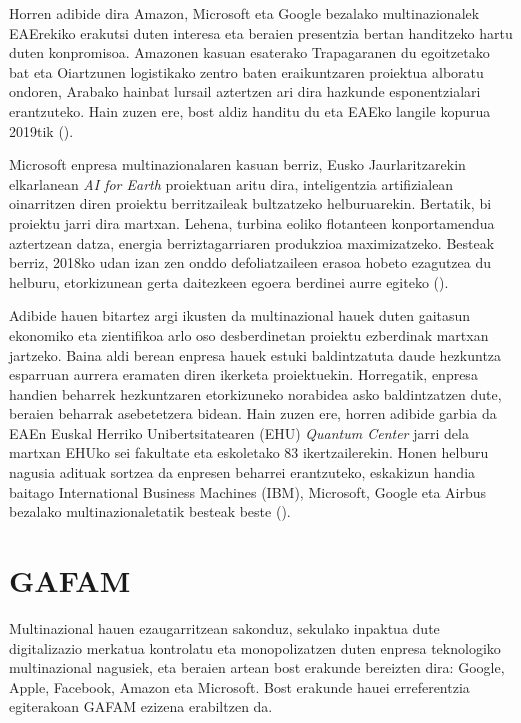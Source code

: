 Horren adibide dira Amazon, Microsoft eta Google bezalako multinazionalek EAErekiko erakutsi duten interesa eta beraien presentzia bertan handitzeko hartu duten konpromisoa. Amazonen kasuan esaterako Trapagaranen du egoitzetako bat eta Oiartzunen logistikako zentro baten eraikuntzaren proiektua alboratu ondoren, Arabako hainbat lursail aztertzen ari dira hazkunde esponentzialari erantzuteko. Hain zuzen ere, bost aldiz handitu du eta EAEko langile kopurua 2019tik (\cite{irigoyen2021amazon}).

Microsoft enpresa multinazionalaren kasuan berriz, Eusko Jaurlaritzarekin elkarlanean \textit{AI for Earth} proiektuan aritu dira, inteligentzia artifizialean oinarritzen diren proiektu berritzaileak bultzatzeko helburuarekin. Bertatik, bi proiektu jarri dira martxan. Lehena, turbina eoliko flotanteen konportamendua aztertzean datza, energia berriztagarriaren produkzioa maximizatzeko. Besteak berriz, 2018ko udan izan zen onddo defoliatzaileen erasoa hobeto ezagutzea du helburu, etorkizunean gerta daitezkeen egoera berdinei aurre egiteko (\cite{microsoft2020microsoft}).

Adibide hauen bitartez argi ikusten da multinazional hauek duten gaitasun ekonomiko eta zientifikoa arlo oso desberdinetan proiektu ezberdinak martxan jartzeko. Baina aldi berean enpresa hauek estuki baldintzatuta daude hezkuntza esparruan aurrera eramaten diren ikerketa proiektuekin. Horregatik, enpresa handien beharrek hezkuntzaren etorkizuneko norabidea asko baldintzatzen dute, beraien beharrak asebetetzera bidean. Hain zuzen ere, horren adibide garbia da EAEn Euskal Herriko Unibertsitatearen (EHU) \textit{Quantum Center} jarri dela martxan EHUko sei fakultate eta eskoletako 83 ikertzailerekin. Honen helburu nagusia adituak sortzea da enpresen beharrei erantzuteko, eskakizun handia baitago International Business Machines (IBM), Microsoft, Google eta Airbus bezalako multinazionaletatik besteak beste (\cite{gamez2020euskadi}).

\section{GAFAM}\label{sec:gafam}

Multinazional hauen ezaugarritzean sakonduz, sekulako inpaktua dute digitalizazio merkatua kontrolatu eta monopolizatzen duten enpresa teknologiko multinazional nagusiek, eta beraien artean bost erakunde bereizten dira: Google, Apple, Facebook, Amazon eta Microsoft. Bost erakunde hauei erreferentzia egiterakoan GAFAM ezizena erabiltzen da. 

